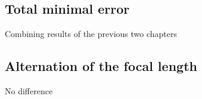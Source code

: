 	
\subsection{Total minimal error}

Combining results of the previous two chapters

\subsection{Alternation of the focal length}
No difference

